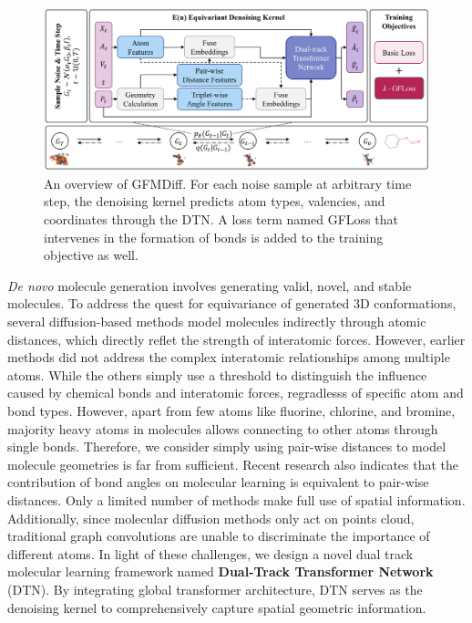 \documentclass[letterpaper]{article} %
\begin{document}
\begin{figure}[t]
\centering
\includegraphics[width=0.8\linewidth]{overview_gfmdiff.png}
\caption{An overview of GFMDiff. For each noise sample at arbitrary time step, the denoising kernel predicts atom types, valencies, and coordinates through the DTN. A loss term named GFLoss that intervenes in the formation of bonds is added to the training objective as well.}
\label{fig:gfmdiff}
\end{figure}

{\itshape De novo} molecule generation involves generating valid, novel, and stable molecules. To address the quest for equivariance of generated 3D conformations, several diffusion-based methods \cite{edm_22_hoogeboom,mdm_23_huang} model molecules indirectly through atomic distances, which directly reflet the strength of interatomic forces. However, earlier methods \cite{edm_22_hoogeboom} did not address the complex interatomic relationships among multiple atoms. While the others \cite{mdm_23_huang} simply use a threshold to distinguish the influence caused by chemical bonds and interatomic forces, regradlesss of specific atom and bond types. However, apart from few atoms like fluorine, chlorine, and bromine, majority heavy atoms in molecules allows connecting to other atoms through single bonds. Therefore, we consider simply using pair-wise distances to model molecule geometries is far from sufficient. Recent research \cite{moleformer_23_yuan} also indicates that the contribution of bond angles on molecular learning is equivalent to pair-wise distances. Only a limited number of methods make full use of spatial information. Additionally, since molecular diffusion methods only act on points cloud, traditional graph convolutions are unable to discriminate the importance of different atoms. In light of these challenges, we design a novel dual track molecular learning framework named \textbf{Dual-Track Transformer Network} (DTN). By integrating global transformer architecture, DTN serves as the denoising kernel to comprehensively capture spatial geometric information.
\end{document}
